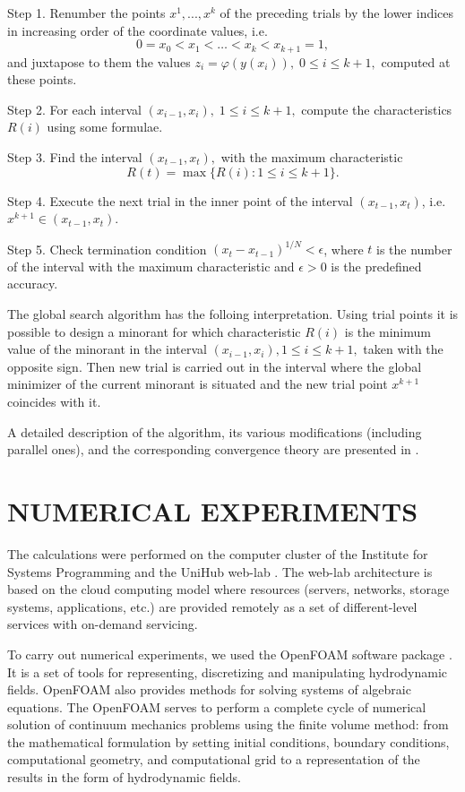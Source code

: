 \documentclass{aip-cp}
\begin{document}
Step 1. Renumber the points  $x^1,...,x^k$ of the preceding trials by the lower indices in increasing order of the coordinate values, i.e.
\begin{equation}\label{x_i}
0=x_0<x_1<\dots <x_k<x_{k+1}=1,
\end{equation}
and juxtapose to them the values $z_i=\varphi(y(x_i)), \; 0 \leq i\leq k+1,$  computed at these points.

Step 2. For each interval $(x_{i-1},x_i), \; 1\leq i \leq k+1,$ compute the characteristics $R(i)$ using some formulae.

Step 3. Find the interval $(x_{t-1},x_t),$ with the maximum characteristic \cite{Grishagin1997}
\[
R(t)=\max\{R(i):1 \leq i \leq k+1\}.
\]

Step 4. Execute the next trial in the inner point of the interval  $(x_{t-1},x_t)$, i.e. $x^{k+1} \in (x_{t-1},x_t)$.

Step 5. Check termination condition  $\left(x_t-x_{t-1}\right)^{1/N}<\epsilon$, where $t$ is the number of the interval with the maximum characteristic and $\epsilon>0$ is the predefined accuracy.

The global search algorithm has the folloing interpretation. Using trial points it is possible to design a minorant for which characteristic $R(i)$ is the minimum value of the minorant in the interval $(x_{i-1}, x_i ), 1 \leq i \leq k + 1,$ taken with the opposite sign. Then new trial is carried out in the interval where the global minimizer of the current minorant is situated and the new trial point $x^{k+1}$ coincides with it.

A detailed description of the algorithm, its various modifications (including parallel ones), and the corresponding convergence  theory are presented in \cite{Strongin2000,Barkalov2010,Strongin2020}.
	

\section{NUMERICAL EXPERIMENTS}

The calculations were performed on the computer cluster of the Institute for Systems Programming and the UniHub web-lab \cite{UniHub}. The web-lab architecture is based on the cloud computing model where resources (servers, networks, storage systems, applications, etc.) are provided remotely as a set of different-level services with on-demand servicing.

To carry out numerical experiments, we used the OpenFOAM software package \cite{OpenFOAM}. It is a set of tools for representing, discretizing and manipulating hydrodynamic fields. OpenFOAM also provides methods for solving systems of algebraic equations. The OpenFOAM serves to perform a complete cycle of numerical solution of continuum mechanics problems using the finite volume method: from the mathematical formulation by setting initial conditions, boundary conditions, computational geometry, and computational grid to a representation of the results in the form of hydrodynamic fields.
\end{document}
